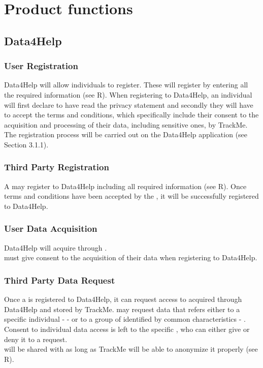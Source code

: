 \documentclass[../../rasd.tex]{subfiles}
\begin{document}
\section{Product functions}

	\subsection{Data4Help}
	
		\subsubsection{User Registration}
		Data4Help will allow individuals to register. These will register by entering all the required information (see R). When registering to Data4Help, an individual will first declare to have read the privacy statement and secondly they will have to accept the terms and conditions, which specifically include their consent to the acquisition and processing of their data, including sensitive ones, by TrackMe.\\
		The  registration process will be carried out on the Data4Help application (see Section 3.1.1).

		\subsubsection{Third Party Registration}
		A  may register to Data4Help including all required information (see R).
		Once terms and conditions have been accepted by the , it will be successfully registered to Data4Help.

		\subsubsection{User Data Acquisition}
		Data4Help will acquire  through . \\
		 must give consent to the acquisition of their data when registering to Data4Help.\\

		\subsubsection{Third Party Data Request}
		Once a  is registered to Data4Help, it can request access to  acquired through Data4Help and stored by TrackMe.  may request data that refers either to a specific individual -  - or to a group of  identified by common characteristics - .\\
		Consent to individual data access is left to the specific , who can either give or deny it to a  request.\\
		 will be shared with  as long as TrackMe will be able to anonymize it properly (see R).
\end{document}

